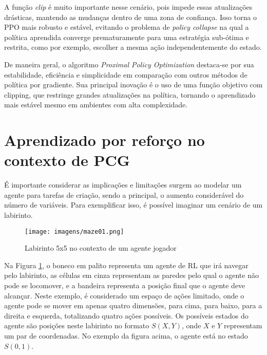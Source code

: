 A função \textit{clip} é muito importante nesse cenário, pois impede essas atualizações drásticas, 
mantendo as mudanças dentro de uma zona de confiança. Isso torna o PPO mais robusto e estável, 
evitando o problema de \textit{policy collapse} na qual a política aprendida converge prematuramente 
para uma estratégia sub-ótima e restrita, como por exemplo, escolher a mesma ação independentemente do estado.

De maneira geral, o algoritmo \textit{Proximal Policy Optimization} destaca-se por sua estabilidade, eficiência e 
simplicidade em comparação com outros métodos de política por gradiente. Sua principal inovação é o uso de uma 
função objetivo com clipping, que restringe grandes atualizações na política, tornando o aprendizado mais estável 
mesmo em ambientes com alta complexidade. 



\section{Aprendizado por reforço no contexto de PCG}
É importante considerar as implicações e limitações surgem ao modelar um agente
para tarefas de criação, sendo a principal, o aumento considerável do número
de variáveis. Para exemplificar isso, é possível imaginar um cenário de um labirinto.

\begin{figure}[htb]
	\caption{\label{ref-maze01}Labirinto 5x5 no contexto de um agente jogador}
	\begin{center}
	    \texttt{[image: imagens/maze01.png]}
	\end{center}
\end{figure}

\FloatBarrier

Na Figura \ref{ref-maze01}, o boneco em palito representa um agente de RL que irá navegar pelo labirinto,
as células em cinza representam as paredes pelo qual o agente não pode se locomover, e a bandeira
representa a posição final que o agente deve alcançar. Neste exemplo, é considerado um
espaço de ações limitado, onde o agente pode se mover em apenas quatro dimensões, para cima, para baixo,
para a direita e esquerda, totalizando quatro ações possíveis. Os possíveis estados do agente são
posições neste labirinto no formato \(S(X,Y)\), onde \(X\) e \(Y\) representam um par de coordenadas.
No exemplo da figura acima, o agente está no estado \(S(0,1)\).

